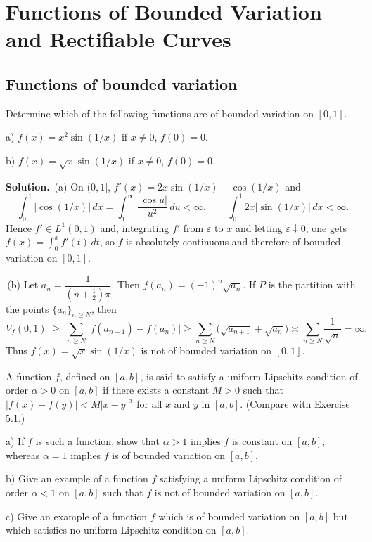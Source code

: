 \chapter{Functions of Bounded Variation and Rectifiable Curves}

\section{Functions of bounded variation}
\begin{problembox}
Determine which of the following functions are of bounded variation on $[0, 1]$.

a) $f(x) = x^2 \sin (1/x)$ if $x \neq 0$, $f(0) = 0$.

b) $f(x) = \sqrt{x} \sin (1/x)$ if $x \neq 0$, $f(0) = 0$.
\end{problembox}

\noindent\textbf{Solution.}
\,(a) On $(0,1]$, $f'(x)=2x\sin(1/x)-\cos(1/x)$ and
\[\int_0^1 |\cos(1/x)|\,dx=\int_1^{\infty}\frac{|\cos u|}{u^2}\,du<\infty,\qquad \int_0^1 2x|\sin(1/x)|\,dx<\infty.
\]
Hence $f'\in L^1(0,1)$ and, integrating $f'$ from $\varepsilon$ to $x$ and letting $\varepsilon\downarrow 0$, one gets $f(x)=\int_0^x f'(t)\,dt$, so $f$ is absolutely continuous and therefore of bounded variation on $[0,1]$.

\,(b) Let $a_n=\dfrac{1}{(n+\tfrac12)\pi}$. Then $f(a_n)=(-1)^n\sqrt{a_n}$. If $P$ is the partition with the points $\{a_n\}_{n\ge N}$, then
\[V_f(0,1)\;\ge\;\sum_{n\ge N}\big|f(a_{n+1})-f(a_n)\big|\ge \sum_{n\ge N}\big(\sqrt{a_{n+1}}+\sqrt{a_n}\big)\asymp\sum_{n\ge N}\frac{1}{\sqrt{n}}=\infty.
\]
Thus $f(x)=\sqrt{x}\sin(1/x)$ is not of bounded variation on $[0,1]$.

\begin{problembox}
A function $f$, defined on $[a, b]$, is said to satisfy a uniform Lipschitz condition of order $\alpha > 0$ on $[a, b]$ if there exists a constant $M > 0$ such that $|f(x) - f(y)| < M |x - y|^\alpha$ for all $x$ and $y$ in $[a, b]$. (Compare with Exercise 5.1.)

a) If $f$ is such a function, show that $\alpha > 1$ implies $f$ is constant on $[a, b]$, whereas $\alpha = 1$ implies $f$ is of bounded variation on $[a, b]$.

b) Give an example of a function $f$ satisfying a uniform Lipschitz condition of order $\alpha < 1$ on $[a, b]$ such that $f$ is not of bounded variation on $[a, b]$.

c) Give an example of a function $f$ which is of bounded variation on $[a, b]$ but which satisfies no uniform Lipschitz condition on $[a, b]$.
\end{problembox}

